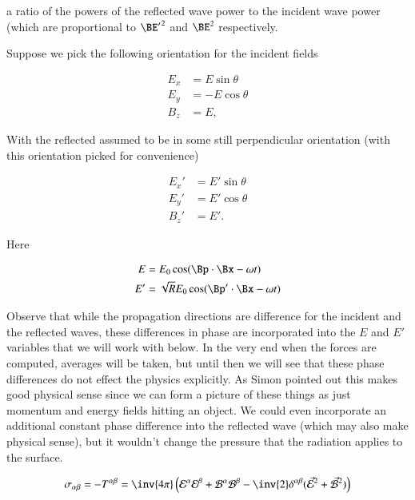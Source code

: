 a ratio of the powers of the reflected wave power to the incident wave power (which are proportional to ${\BE'}^2$ and ${\BE}^2$ respectively.

Suppose we pick the following orientation for the incident fields

\begin{align}\label{eqn:relativisticElectrodynamicsT9:70}
E_x &= E \sin\theta \\
E_y &= -E \cos\theta \\
B_z &= E ,
\end{align}

With the reflected assumed to be in some still perpendicular orientation (with this orientation picked for convenience)

\begin{align}\label{eqn:relativisticElectrodynamicsT9:90}
E_x' &= E' \sin\theta \\
E_y' &= E' \cos\theta \\
B_z' &= E'.
\end{align}

Here

\begin{align}\label{eqn:relativisticElectrodynamicsT9:110}
E &= E_0 \cos(\Bp \cdot \Bx - \omega t) \\
E' &= \sqrt{R} E_0 \cos(\Bp' \cdot \Bx - \omega t)
\end{align}

Observe that while the propagation directions are difference for the incident and the reflected waves, these differences in phase are incorporated into the $E$ and $E'$ variables that we will work with below.  In the very end when the forces are computed, averages will be taken, but until then we will see that these phase differences do not effect the physics explicitly.  As Simon pointed out this makes good physical sense since we can form a picture of these things as just momentum and energy fields hitting an object.  We could even incorporate an additional constant phase difference into the reflected wave (which may also make physical sense), but it wouldn't change the pressure that the radiation applies to the surface.

\begin{equation}\label{eqn:relativisticElectrodynamicsT9:130}
\sigma_{\alpha\beta} = -T^{\alpha\beta} = \inv{4\pi} \left(
\mathcal{E}^\alpha
\mathcal{E}^\beta
+\mathcal{B}^\alpha
\mathcal{B}^\beta
- \inv{2} \delta^{\alpha\beta} ( \vec{\mathcal{E}}^2 + \vec{\mathcal{B}}^2 )
\right)
\end{equation}

